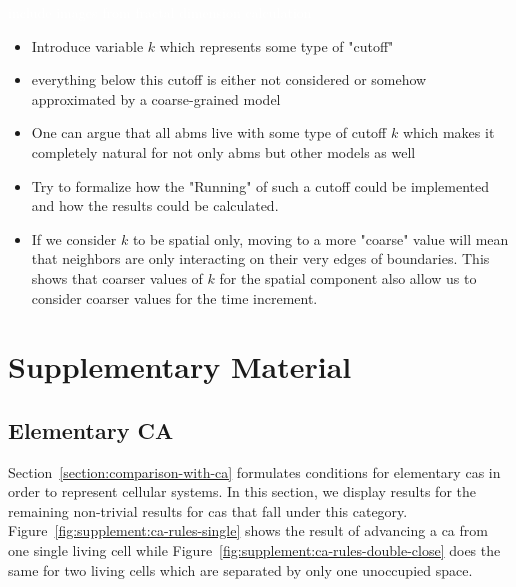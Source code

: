 \documentclass{article}
\newcommand{\todo}[1]{\colorbox{WildStrawberry}{\textcolor{white}{#1}}}
\begin{document}
\todo{include images from fractal dimension calculation}
\begin{itemize}
    \item Introduce variable $k$ which represents some type of "cutoff"
    \item everything below this cutoff is either not considered or somehow approximated by a
        coarse-grained model
    \item One can argue that all \acp{abm} live with some type of cutoff $k$ which makes it
        completely natural for not only \acp{abm} but other models as well
    \item Try to formalize how the "Running" of such a cutoff could be implemented and how the
        results could be calculated.
    \item If we consider $k$ to be spatial only, moving to a more "coarse" value will mean that
        neighbors are only interacting on their very edges of boundaries.
        This shows that coarser values of $k$ for the spatial component also allow us to consider
        coarser values for the time increment.
\end{itemize}




\section{Supplementary Material}
\subsection{Elementary CA}
Section~\ref{section:comparison-with-ca} formulates conditions for elementary \acp{ca} in order to
represent cellular systems.
In this section, we display results for the remaining non-trivial results for \acp{ca} that fall
under this category.
Figure~\ref{fig:supplement:ca-rules-single} shows the result of advancing a \ac{ca} from one single
living cell while Figure~\ref{fig:supplement:ca-rules-double-close} does the same for two living
cells which are separated by only one unoccupied space.
\end{document}
